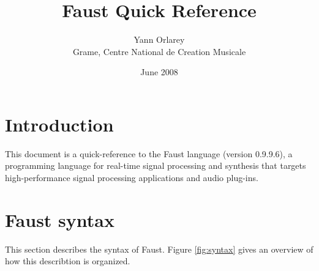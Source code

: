 \documentclass{article}
\begin{document}


\title{Faust Quick Reference}
\author{Yann Orlarey\\Grame, Centre National de Creation Musicale}
\date{June 2008}



\newcommand{\farg}[1]{\textrm{\textit{#1}}}
\newcommand{\ldbrack}{[\![ \,}
\newcommand{\rdbrack}{\, ]\!] }
\newcommand{\rdbrackC}{\rdbrack_{\mathrm{C}}\,}
\newcommand{\dbrack}[1]{\ldbrack #1 \rdbrack}
\newcommand{\semantic}[1]{\ldbrack #1 \rdbrack}
\newcommand{\dbrackC}[1]{\ldbrack #1 \rdbrackC}

\setlength{\parindent}{0pt}
\setlength{\parskip}{1ex plus 0.5ex minus 0.2ex}

\maketitle

\section{Introduction}

This document is a quick-reference to the Faust language (version 0.9.9.6), a programming language for real-time signal processing and synthesis that targets high-performance signal processing applications and audio plug-ins.

\section{Faust syntax}

This section describes the syntax of Faust. Figure \ref{fig:syntax} gives an overview of how this describtion is organized. 
\end{document}
